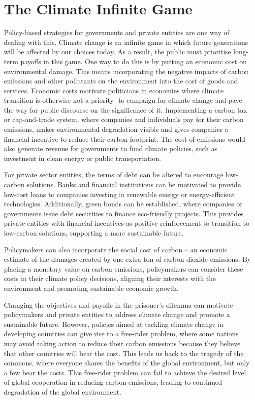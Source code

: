 \documentclass[12pt,a4paper]{article}
\begin{document}
\section*{The Climate Infinite Game}
Policy-based strategies for governments and private entities are one way of dealing with this. Climate change is an infinite game in which future generations will be affected by our choices today. As a result, the public must prioritise long-term payoffs in this game. One way to do this is by putting an economic cost on environmental damage. This means incorporating the negative impacts of carbon emissions and other pollutants on the environment into the cost of goods and services. Economic costs motivate politicians in economies where climate transition is otherwise not a priority- to campaign for climate change and pave the way for public discourse on the significance of it. Implementing a carbon tax or cap-and-trade system, where companies and individuals pay for their carbon emissions, makes environmental degradation visible and gives companies a financial incentive to reduce their carbon footprint. The cost of emissions would also generate revenue for governments to fund climate policies, such as investment in clean energy or public transportation. \par
For private sector entities, the terms of debt can be altered to encourage low-carbon solutions. Banks and financial institutions can be motivated to provide low-cost loans to companies investing in renewable energy or energy-efficient technologies. Additionally, green bonds can be established, where companies or governments issue debt securities to finance eco-friendly projects. This provides private entities with financial incentives as positive reinforcement to transition to low-carbon solutions, supporting a more sustainable future.   \par
Policymakers can also incorporate the social cost of carbon – an economic estimate of the damages created by one extra ton of carbon dioxide emissions. By placing a monetary value on carbon emissions, policymakers can consider these costs in their climate policy decisions, aligning their interests with the environment and promoting sustainable economic growth.  \par
Changing the objectives and payoffs in the prisoner's dilemma can motivate policymakers and private entities to address climate change and promote a sustainable future. However, policies aimed at tackling climate change in developing countries can give rise to a free-rider problem, where some nations may avoid taking action to reduce their carbon emissions because they believe that other countries will bear the cost. This leads us back to the tragedy of the commons, where everyone shares the benefits of the global environment, but only a few bear the costs. This free-rider problem can fail to achieve the desired level of global cooperation in reducing carbon emissions, leading to continued degradation of the global environment.  \par
\end{document}
